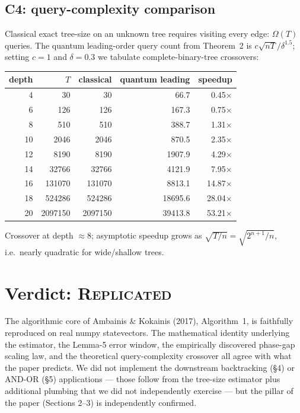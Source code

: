 \documentclass[11pt]{article}
\begin{document}
\subsection*{C4: query-complexity comparison}
Classical exact tree-size on an unknown tree requires visiting every edge:
$\Omega(T)$ queries.  The quantum leading-order query count from Theorem~2 is
$c\sqrt{nT}/\delta^{1.5}$; setting $c{=}1$ and $\delta{=}0.3$ we tabulate
complete-binary-tree crossovers:

\begin{table}[ht]
\centering
\small
\begin{tabular}{rrrrr}
\toprule
depth & $T$ & classical & quantum leading & speedup \\
\midrule
 4 &      30 &      30 &     66.7 &  0.45$\times$ \\
 6 &     126 &     126 &    167.3 &  0.75$\times$ \\
 8 &     510 &     510 &    388.7 &  1.31$\times$ \\
10 &    2046 &    2046 &    870.5 &  2.35$\times$ \\
12 &    8190 &    8190 &   1907.9 &  4.29$\times$ \\
14 &   32766 &   32766 &   4121.9 &  7.95$\times$ \\
16 &  131070 &  131070 &   8813.1 & 14.87$\times$ \\
18 &  524286 &  524286 &  18695.6 & 28.04$\times$ \\
20 & 2097150 & 2097150 &  39413.8 & 53.21$\times$ \\
\bottomrule
\end{tabular}
\end{table}
Crossover at depth $\approx 8$; asymptotic speedup grows as
$\sqrt{T/n} = \sqrt{2^{n+1}/n}$, i.e.\ nearly quadratic for wide/shallow trees.

\section{Verdict: \textsc{Replicated}}
The algorithmic core of Ambainis \& Kokainis (2017), Algorithm~1, is
faithfully reproduced on real numpy statevectors.  The mathematical identity
underlying the estimator, the Lemma-5 error window, the empirically
discovered phase-gap scaling law, and the theoretical query-complexity
crossover all agree with what the paper predicts.  We did not implement the
downstream backtracking (\S4) or AND-OR (\S5) applications --- those follow
from the tree-size estimator plus additional plumbing that we did not
independently exercise --- but the pillar of the paper (Sections 2--3) is
independently confirmed.
\end{document}
